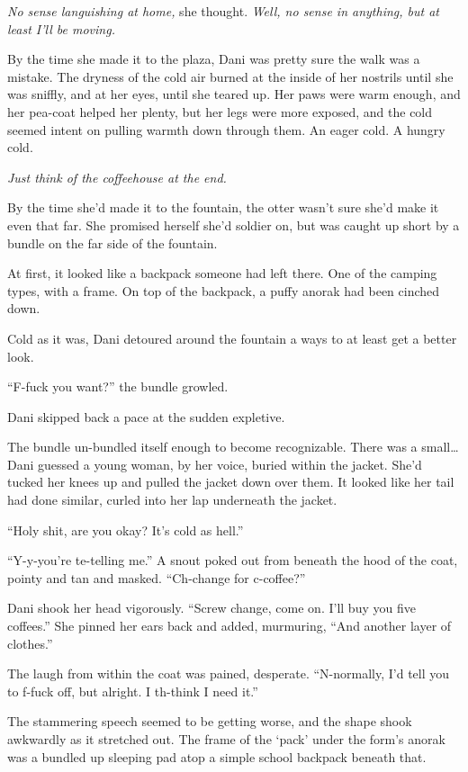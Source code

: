 \emph{No sense languishing at home,} she thought. \emph{Well, no sense in anything, but at least I'll be moving.}

By the time she made it to the plaza, Dani was pretty sure the walk was a mistake. The dryness of the cold air burned at the inside of her nostrils until she was sniffly, and at her eyes, until she teared up. Her paws were warm enough, and her pea-coat helped her plenty, but her legs were more exposed, and the cold seemed intent on pulling warmth down through them. An eager cold. A hungry cold.

\emph{Just think of the coffeehouse at the end.}

By the time she'd made it to the fountain, the otter wasn't sure she'd make it even that far. She promised herself she'd soldier on, but was caught up short by a bundle on the far side of the fountain.

At first, it looked like a backpack someone had left there. One of the camping types, with a frame. On top of the backpack, a puffy anorak had been cinched down.

Cold as it was, Dani detoured around the fountain a ways to at least get a better look.

``F-fuck you want?'' the bundle growled.

Dani skipped back a pace at the sudden expletive.

The bundle un-bundled itself enough to become recognizable. There was a small\ldots{}Dani guessed a young woman, by her voice, buried within the jacket. She'd tucked her knees up and pulled the jacket down over them. It looked like her tail had done similar, curled into her lap underneath the jacket.

``Holy shit, are you okay? It's cold as hell.''

``Y-y-you're te-telling me.'' A snout poked out from beneath the hood of the coat, pointy and tan and masked. ``Ch-change for c-coffee?''

Dani shook her head vigorously. ``Screw change, come on. I'll buy you five coffees.'' She pinned her ears back and added, murmuring, ``And another layer of clothes.''

The laugh from within the coat was pained, desperate. ``N-normally, I'd tell you to f-fuck off, but alright. I th-think I need it.''

The stammering speech seemed to be getting worse, and the shape shook awkwardly as it stretched out. The frame of the `pack' under the form's anorak was a bundled up sleeping pad atop a simple school backpack beneath that.

